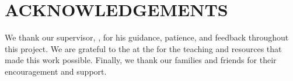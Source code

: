\chapter*{ACKNOWLEDGEMENTS}

We thank our supervisor, \Supervisor, for his guidance, patience, and feedback
throughout this project. We are grateful to the \FacultyName{} at the
\InstitutionName{} for the teaching and resources that made this work possible.
Finally, we thank our families and friends for their encouragement and support.

\clearpage
